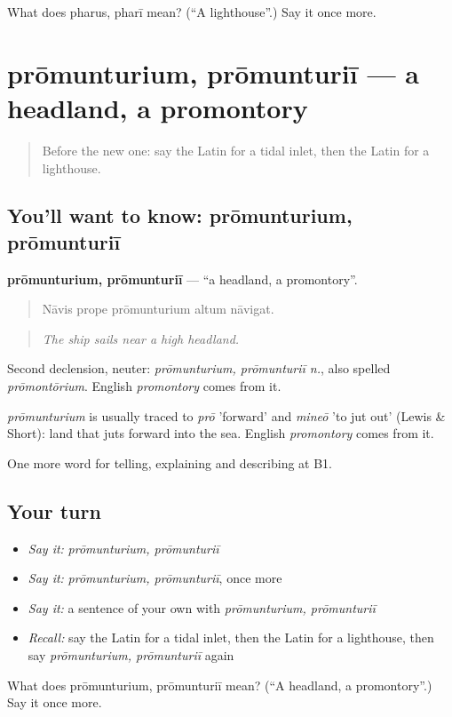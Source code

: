 \begin{tcolorbox}[breakable,colback=teal!4,colframe=teal!35!black,title={Before you move on}]
What does pharus, pharī mean? (\textquotedblleft{}A lighthouse\textquotedblright{}.) Say it once more.
\end{tcolorbox}
\section[prōmunturium, prōmunturiī]{prōmunturium, prōmunturiī — a headland, a promontory}

\label{lesson:LA-C441-promunturium}



\begin{quote}
Before the new one: say the Latin for a tidal inlet, then the Latin for a lighthouse.
\end{quote}

\subsection*{You'll want to know: prōmunturium, prōmunturiī}
\textbf{prōmunturium, prōmunturiī} — \textquotedblleft{}a headland, a promontory\textquotedblright{}.

\begin{quote}
Nāvis prope prōmunturium altum nāvigat.
\end{quote}

\begin{quote}
\emph{The ship sails near a high headland.}
\end{quote}

Second declension, neuter: \emph{prōmunturium, prōmunturiī n.}, also spelled \emph{prōmontōrium}. English \emph{promontory} comes from it.

\begin{cousinweb}
\emph{prōmunturium} is usually traced to \emph{prō} 'forward' and \emph{mineō} 'to jut out' (Lewis \& Short): land that juts forward into the sea. English \emph{promontory} comes from it.
\end{cousinweb}

\begin{grammarlens}[title={What you've built}]
One more word for telling, explaining and describing at B1.
\end{grammarlens}

\subsection*{Your turn}
\begin{itemize}
\raggedright
  \item \emph{Say it:} \emph{prōmunturium, prōmunturiī}
  \item \emph{Say it:} \emph{prōmunturium, prōmunturiī}, once more
  \item \emph{Say it:} a sentence of your own with \emph{prōmunturium, prōmunturiī}
  \item \emph{Recall:} say the Latin for a tidal inlet, then the Latin for a lighthouse, then say \emph{prōmunturium, prōmunturiī} again
\end{itemize}

\begin{tcolorbox}[breakable,colback=teal!4,colframe=teal!35!black,title={Before you move on}]
What does prōmunturium, prōmunturiī mean? (\textquotedblleft{}A headland, a promontory\textquotedblright{}.) Say it once more.
\end{tcolorbox}
